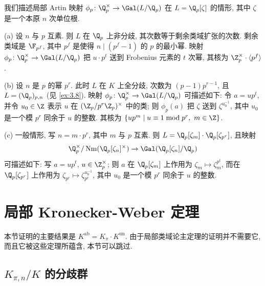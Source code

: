 \begin{example}\label{ex:3.13}
我们描述局部 Artin 映射 $\phi_p\colon\Q_p^{\times}\to\Gal(L/\Q_p)$ 在 $L=\Q_p[\zeta]$ 的情形, 其中 $\zeta$ 是一个本原 $n$ 次单位根.

(a) 设 $n$ 与 $p$ 互素. 则 $L$ 在 $\Q_p$ 上非分歧, 其次数等于剩余类域扩张的次数. 剩余类域是 $\F_{p^f}$, 其中 $p^f$ 是使得 $n\mid(p^f-1)$ 的 $p$ 的最小幂. 映射 $\phi_p\colon\Q_p^{\times}\to\Gal(L/\Q_p)$ 把 $u\cdot p^t$ 送到 Frobenius 元素的 $t$ 次幂, 其核为 $\Z_p^{\times}\cdot\langle p^f\rangle$.

(b) 设 $n$ 是 $p$ 的幂 $p^r$. 此时 $L$ 在 $K$ 上全分歧, 次数为 $(p-1)p^{r-1}$, 且 $L=(\Q_p)_{p,n}$ (见 \ref{ex:3.8}). 映射 $\phi_p\colon\Q_p^{\times}\to\Gal(L/\Q_p)$ 可描述如下: 令 $a=up^t$, 并令 $u_0\in\Z$ 表示 $u$ 在 $(\Z_p/p^r\Z_p)^{\times}$ 中的类; 则 $\phi_p(a)$ 把 $\zeta$ 送到 $\zeta^{u_0^{-1}}$, 其中 $u_0$ 是一个模 $p^r$ 同余于 $u$ 的整数. 其核为 $\{up^m\mid u\equiv 1\bmod p^r,\ m\in\Z\}$.

(c) 一般情形, 写 $n=m\cdot p^r$, 其中 $m$ 与 $p$ 互素. 则 $L=\Q_p[\zeta_m]\cdot\Q_p[\zeta_{p^r}]$, 且映射
\[
\Q_p^{\times}/\Nm(\Q_p[\zeta_n]^{\times})\to\Gal(\Q_p[\zeta_n]/\Q_p)
\]
可描述如下: 写 $a=up^t$, $u\in\Z_p^{\times}$; 则 $a$ 在 $\Q_p[\zeta_m]$ 上作用为 $\zeta_m\mapsto\zeta_m^{p^t}$, 而在 $\Q_p[\zeta_{p^r}]$ 上作用为 $\zeta_{p^r}\mapsto\zeta_{p^r}^{u_0^{-1}}$, 其中 $u_0$ 是一个模 $p^r$ 同余于 $u$ 的整数.
\end{example}

\section{局部 Kronecker-Weber 定理}\label{sec:I.4}

本节证明的主要结果是 $K^{\mathrm{ab}}=K_{\pi}\cdot K^{\mathrm{un}}$. 由于局部类域论主定理的证明并不需要它, 而且它被这些定理所蕴含, 本节可以跳过.

\subsection*{$K_{\pi,n}/K$ 的分歧群}

